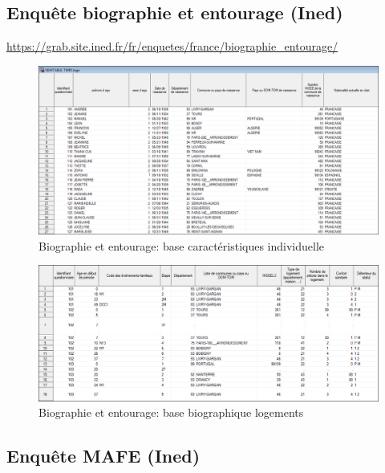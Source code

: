 \documentclass[
  12pt,
  letterpaper,
  DIV=11,
  numbers=noendperiod,
  onepage,
  openany]{scrreprt}
\begin{document}
\hypertarget{enquuxeate-biographie-et-entourage-ined}{%
\subsection{Enquête biographie et entourage
(Ined)}\label{enquuxeate-biographie-et-entourage-ined}}

\url{https://grab.site.ined.fr/fr/enquetes/france/biographie_entourage/}

\begin{figure}

\caption{Biographie et entourage: base caractéristiques individuelle}

{\centering \includegraphics{images/Image1.png}

}

\end{figure}

\begin{figure}

\caption{Biographie et entourage: base biographique logements}

{\centering \includegraphics{images/Image2.png}

}

\end{figure}

\hypertarget{enquuxeate-mafe-ined}{%
\subsection{Enquête MAFE (Ined)}\label{enquuxeate-mafe-ined}}
\end{document}
